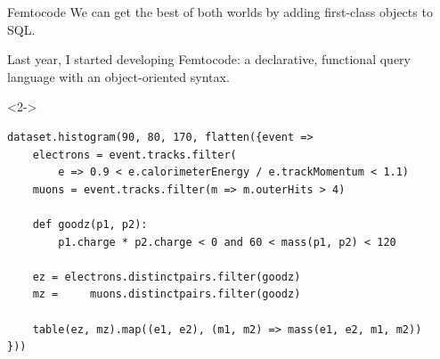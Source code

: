\documentclass[aspectratio=169]{beamer}
\begin{document}
\begin{frame}[fragile]{Femtocode}
\vspace{0.35 cm}
We can get the best of both worlds by adding first-class objects to SQL.

\vspace{0.2 cm}
Last year, I started developing Femtocode: a declarative, functional query language with an object-oriented syntax.

\begin{uncoverenv}<2->
\begin{center}
\small
\begin{lstlisting}[language=femtocode]
dataset.histogram(90, 80, 170, flatten({event =>
    electrons = event.tracks.filter(
        e => 0.9 < e.calorimeterEnergy / e.trackMomentum < 1.1)
    muons = event.tracks.filter(m => m.outerHits > 4)

    def goodz(p1, p2):
        p1.charge * p2.charge < 0 and 60 < mass(p1, p2) < 120

    ez = electrons.distinctpairs.filter(goodz)
    mz =     muons.distinctpairs.filter(goodz)

    table(ez, mz).map((e1, e2), (m1, m2) => mass(e1, e2, m1, m2))
}))
\end{lstlisting}
\end{center}
\end{uncoverenv}
\end{frame}
\end{document}
